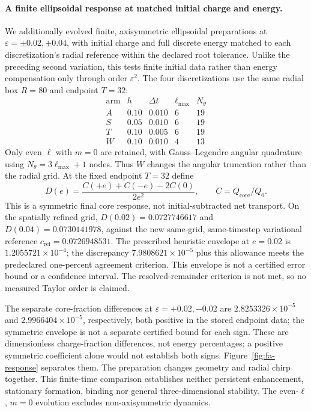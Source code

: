\paragraph{A finite ellipsoidal response at matched initial charge and energy.}
We additionally evolved finite, axisymmetric ellipsoidal preparations at
$\varepsilon=\pm0.02,\pm0.04$, with initial charge and full discrete energy
matched to each discretization's radial reference within the declared root
tolerance. Unlike the preceding second variation, this tests finite initial
data rather than energy compensation only through order $\varepsilon^2$.
The four discretizations use the same radial box $R=80$ and endpoint $T=32$:
\[
\begin{array}{c|cccc}
\text{arm}&h&\Delta t&\ell_{\max}&N_\theta\\ \hline
A&0.10&0.010&6&19\\
S&0.05&0.010&6&19\\
T&0.10&0.005&6&19\\
W&0.10&0.010&4&13
\end{array}
\]
Only even $\ell$ with $m=0$ are retained, with Gauss--Legendre angular
quadrature using $N_\theta=3\ell_{\max}+1$ nodes. Thus $W$ changes the
angular truncation rather than the radial grid.
At the fixed endpoint $T=32$ define
\[
 D(e)=\frac{C(+e)+C(-e)-2C(0)}{2e^2},\qquad C=Q_{\mathrm{core}}/Q_0.
\]
This is a symmetric final core response, not initial-subtracted net transport.
On the spatially refined grid,
$D(0.02)=0.0727746617$ and $D(0.04)=0.0730141978$, against the new
same-grid, same-timestep variational reference $c_{\mathrm{ref}}=0.0726948531$.
The prescribed heuristic envelope at $e=0.02$ is $1.2055721\times10^{-4}$;
the discrepancy $7.9808621\times10^{-5}$ plus this allowance meets the
predeclared one-percent agreement criterion. This envelope is not a certified
error bound or a confidence interval. The resolved-remainder criterion is
not met, so no measured Taylor order is claimed.

The separate core-fraction differences at $\varepsilon=+0.02,-0.02$ are
$2.8253326\times10^{-5}$ and $2.9966404\times10^{-5}$, respectively,
both positive in the stored endpoint data; the symmetric envelope is not
a separate certified bound for each sign. These are dimensionless charge-fraction
differences, not energy percentages; a positive symmetric coefficient alone
would not establish both signs. Figure~\ref{fig:fa-response} separates them.
The preparation changes geometry and radial chirp together. This finite-time
comparison establishes neither persistent enhancement, stationary formation,
binding nor general three-dimensional stability. The even-$\ell$, $m=0$
evolution excludes non-axisymmetric dynamics.

